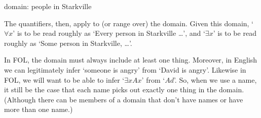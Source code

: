 \begin{earg}
\item[] domain: people in Starkville
\end{earg}
The quantifiers, then, apply to (or range over) the domain. Given this domain, ‘$\forall x$’ is to be read roughly as ‘Every person in Starkville \ldots ’, and ‘$\exists x$’ is to be read roughly as ‘Some person in Starkville, \ldots ’.

In FOL, the domain must always include at least one thing. Moreover, in English we can legitimately infer ‘someone is angry’ from ‘David is angry’. Likewise in FOL, we will want to be able to infer ‘$\exists xAx$’ from ‘$Ad$’. So, when we use a name, it still be the case that each name picks out exactly one thing in the domain. (Although there can be members of a domain that don’t have names or have more than one name.)




